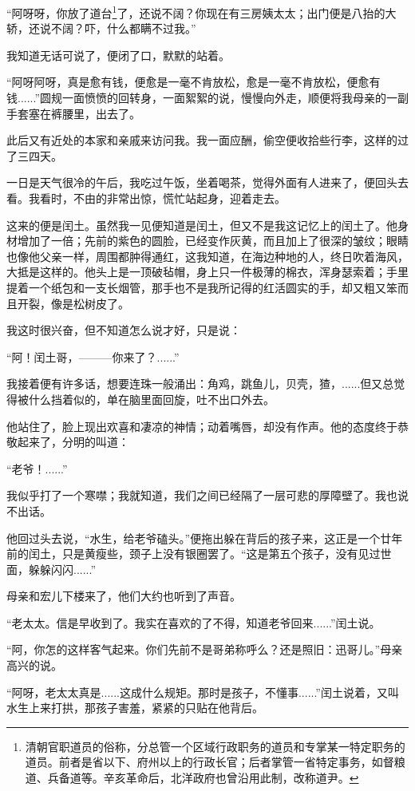 \documentclass[12pt,UTF8]{ctexbook}
\begin{document}
“阿呀呀，你放了道台\footnote{清朝官职道员的俗称，分总管一个区域行政职务的道员和专掌某一特定职务的道员。前者是省以下、府州以上的行政长官；后者掌管一省特定事务，如督粮道、兵备道等。辛亥革命后，北洋政府也曾沿用此制，改称道尹。}了，还说不阔？你现在有三房姨太太；出门便是八抬的大轿，还说不阔？吓，什么都瞒不过我。”

我知道无话可说了，便闭了口，默默的站着。

“阿呀阿呀，真是愈有钱，便愈是一毫不肯放松，愈是一毫不肯放松，便愈有钱......”圆规一面愤愤的回转身，一面絮絮的说，慢慢向外走，顺便将我母亲的一副手套塞在裤腰里，出去了。

此后又有近处的本家和亲戚来访问我。我一面应酬，偷空便收拾些行李，这样的过了三四天。

一日是天气很冷的午后，我吃过午饭，坐着喝茶，觉得外面有人进来了，便回头去看。我看时，不由的非常出惊，慌忙站起身，迎着走去。

这来的便是闰土。虽然我一见便知道是闰土，但又不是我这记忆上的闰土了。他身材增加了一倍；先前的紫色的圆脸，已经变作灰黄，而且加上了很深的皱纹；眼睛也像他父亲一样，周围都肿得通红，这我知道，在海边种地的人，终日吹着海风，大抵是这样的。他头上是一顶破毡帽，身上只一件极薄的棉衣，浑身瑟索着；手里提着一个纸包和一支长烟管，那手也不是我所记得的红活圆实的手，却又粗又笨而且开裂，像是松树皮了。

我这时很兴奋，但不知道怎么说才好，只是说：

“阿！闰土哥，———你来了？......”

我接着便有许多话，想要连珠一般涌出：角鸡，跳鱼儿，贝壳，猹，......但又总觉得被什么挡着似的，单在脑里面回旋，吐不出口外去。

他站住了，脸上现出欢喜和凄凉的神情；动着嘴唇，却没有作声。他的态度终于恭敬起来了，分明的叫道：

“老爷！......”

我似乎打了一个寒噤；我就知道，我们之间已经隔了一层可悲的厚障壁了。我也说不出话。

他回过头去说，“水生，给老爷磕头。”便拖出躲在背后的孩子来，这正是一个廿年前的闰土，只是黄瘦些，颈子上没有银圈罢了。“这是第五个孩子，没有见过世面，躲躲闪闪......”

母亲和宏儿下楼来了，他们大约也听到了声音。

“老太太。信是早收到了。我实在喜欢的了不得，知道老爷回来......”闰土说。

“阿，你怎的这样客气起来。你们先前不是哥弟称呼么？还是照旧：迅哥儿。”母亲高兴的说。

“阿呀，老太太真是......这成什么规矩。那时是孩子，不懂事......”闰土说着，又叫水生上来打拱，那孩子害羞，紧紧的只贴在他背后。
\end{document}
